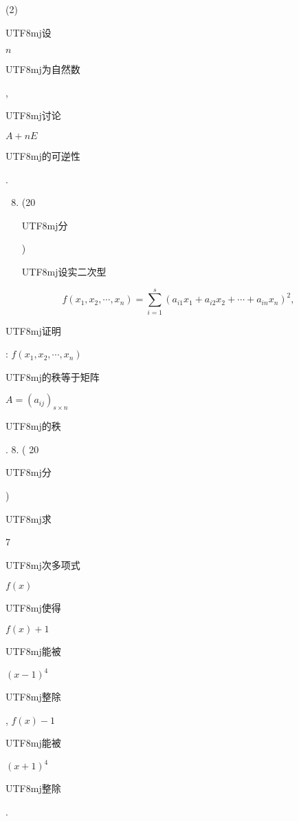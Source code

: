 \documentclass[10pt]{article}
\begin{document}
(2) \begin{CJK}{UTF8}{mj}设\end{CJK} $n$ \begin{CJK}{UTF8}{mj}为自然数\end{CJK}, \begin{CJK}{UTF8}{mj}讨论\end{CJK} $A+n E$ \begin{CJK}{UTF8}{mj}的可逆性\end{CJK}.

\begin{enumerate}
  \setcounter{enumi}{7}
  \item (20 \begin{CJK}{UTF8}{mj}分\end{CJK}) \begin{CJK}{UTF8}{mj}设实二次型\end{CJK}
\end{enumerate}
$$
f\left(x_{1}, x_{2}, \cdots, x_{n}\right)=\sum_{i=1}^{s}\left(a_{i 1} x_{1}+a_{i 2} x_{2}+\cdots+a_{i n} x_{n}\right)^{2},
$$
\begin{CJK}{UTF8}{mj}证明\end{CJK}: $f\left(x_{1}, x_{2}, \cdots, x_{n}\right)$ \begin{CJK}{UTF8}{mj}的秩等于矩阵\end{CJK} $A=\left(a_{i j}\right)_{s \times n}$ \begin{CJK}{UTF8}{mj}的秩\end{CJK}. 8. ( 20 \begin{CJK}{UTF8}{mj}分\end{CJK}) \begin{CJK}{UTF8}{mj}求\end{CJK} 7 \begin{CJK}{UTF8}{mj}次多项式\end{CJK} $f(x)$ \begin{CJK}{UTF8}{mj}使得\end{CJK} $f(x)+1$ \begin{CJK}{UTF8}{mj}能被\end{CJK} $(x-1)^{4}$ \begin{CJK}{UTF8}{mj}整除\end{CJK}, $f(x)-1$ \begin{CJK}{UTF8}{mj}能被\end{CJK} $(x+1)^{4}$ \begin{CJK}{UTF8}{mj}整除\end{CJK}.
\end{document}
